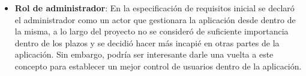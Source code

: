 \begin{itemize}
    \item \textbf{Rol de administrador}: En la especificación de requisitos inicial se declaró el administrador como un actor que gestionara la aplicación desde dentro de la misma, a lo largo del proyecto no se consideró de suficiente importancia dentro de los plazos y se decidió hacer más incapié en otras partes de la aplicación. Sin embargo, podría ser interesante darle una vuelta a este concepto para establecer un mejor control de usuarios dentro de la aplicación.
\end{itemize}


